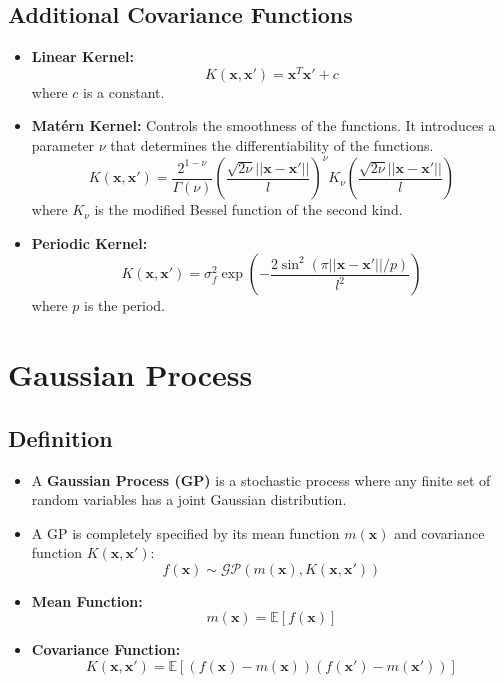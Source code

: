 \documentclass[12pt]{article}
\begin{document}
\subsection{Additional Covariance Functions}
\begin{itemize}
    \item \textbf{Linear Kernel:}
    \[
    K(\mathbf{x}, \mathbf{x}') = \mathbf{x}^T \mathbf{x}' + c
    \]
    where \( c \) is a constant.
    \item \textbf{Matérn Kernel:} Controls the smoothness of the functions. It introduces a parameter \( \nu \) that determines the differentiability of the functions.
    \[
    K(\mathbf{x}, \mathbf{x}') = \frac{2^{1-\nu}}{\Gamma(\nu)} \left( \frac{\sqrt{2\nu} ||\mathbf{x} - \mathbf{x}'||}{l} \right)^\nu K_\nu\left( \frac{\sqrt{2\nu} ||\mathbf{x} - \mathbf{x}'||}{l} \right)
    \]
    where \( K_\nu \) is the modified Bessel function of the second kind.
    \item \textbf{Periodic Kernel:}
    \[
    K(\mathbf{x}, \mathbf{x}') = \sigma_f^2 \exp\left( -\frac{2\sin^2(\pi ||\mathbf{x} - \mathbf{x}'|| / p)}{l^2} \right)
    \]
    where \( p \) is the period.
\end{itemize}

\section{Gaussian Process}

\subsection{Definition}
\begin{itemize}
    \item A \textbf{Gaussian Process (GP)} is a stochastic process where any finite set of random variables has a joint Gaussian distribution.
    \item A GP is completely specified by its mean function \( m(\mathbf{x}) \) and covariance function \( K(\mathbf{x}, \mathbf{x}') \):
    \[
    f(\mathbf{x}) \sim \mathcal{GP}(m(\mathbf{x}), K(\mathbf{x}, \mathbf{x}'))
    \]
    \item \textbf{Mean Function:}
    \[
    m(\mathbf{x}) = \mathbb{E}[f(\mathbf{x})]
    \]
    \item \textbf{Covariance Function:}
    \[
    K(\mathbf{x}, \mathbf{x}') = \mathbb{E}\left[ (f(\mathbf{x}) - m(\mathbf{x}))(f(\mathbf{x}') - m(\mathbf{x}')) \right]
    \]
\end{itemize}
\end{document}
